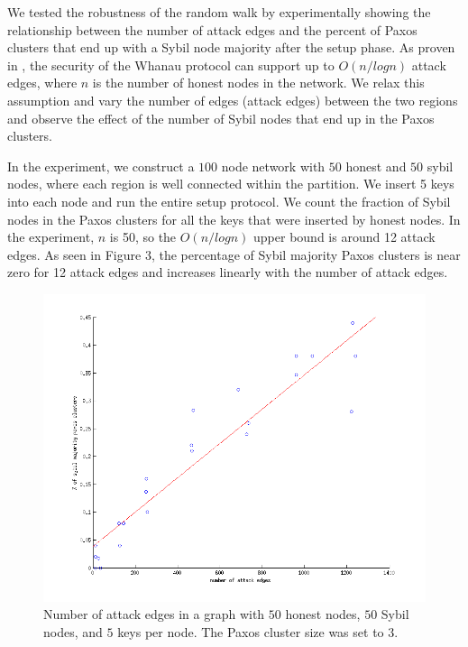 \documentclass[letter]{article}
\begin{document}
We tested the robustness of the random walk by experimentally showing the relationship between the number
of attack edges and the percent of Paxos clusters that end up with a Sybil node majority after the setup phase.
As proven in \cite{Whanau}, the security of the Whanau protocol can support
up to $O(n/logn)$ attack edges, where $n$ is the number of honest nodes in the network.
We relax this assumption and vary the number of edges (attack edges) between the two regions
and observe the effect of the number of Sybil nodes that end up in the Paxos clusters.

In the experiment, we construct a $100$ node network with $50$ honest and $50$ sybil nodes, where each region is well connected within the partition.
We insert 5 keys into each node and run the entire setup protocol. We count the fraction of
Sybil nodes in the Paxos clusters for all the keys that were inserted by honest nodes.
In the experiment, $n$ is 50, so the $O(n/logn)$ upper bound is around 12 attack edges.
As seen in Figure 3, the percentage of Sybil majority Paxos clusters is near zero for 12 attack edges
and increases linearly with the number of attack edges.

\begin{figure}[h]
\centering
\includegraphics[width=1.0\columnwidth]{sybilcluster-3}
\caption{Number of attack edges in a graph with $50$ honest nodes, $50$ Sybil nodes, and $5$ keys per node. The Paxos cluster size was set to $3$.}
\label{fig:sybilcluster-3}
\end{figure}
\end{document}
